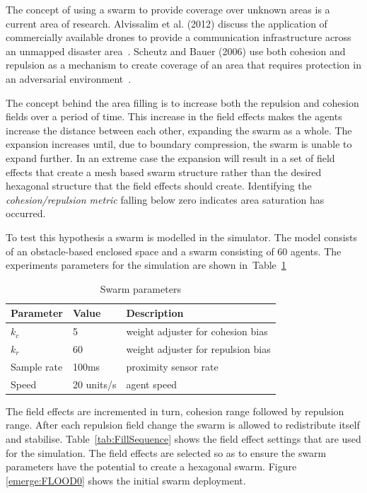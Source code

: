 \documentclass{ieeeaccess}
\begin{document}
The concept of using a swarm to provide coverage over unknown areas is a current area of research. Alvissalim et al. (2012) discuss the application of commercially available drones to provide a communication infrastructure across an unmapped disaster area~\cite{AZHMJJM:12}. Scheutz and Bauer (2006) use both cohesion and repulsion as a mechanism to create coverage of an area that requires protection in an adversarial environment~\cite{SB:06}.

The concept behind the area filling is to increase both the repulsion and cohesion fields over a period of time. This increase in the field effects makes the agents increase the distance between each other, expanding the swarm as a whole. The expansion increases until, due to boundary compression, the swarm is unable to expand further. In an extreme case the expansion will result in a set of field effects that create a mesh based swarm structure rather than the desired hexagonal structure that the field effects should create. Identifying the \textit{cohesion/repulsion metric} falling below zero indicates area saturation has occurred.

To test this hypothesis a swarm is modelled in the simulator. The model consists of an obstacle-based enclosed space and a swarm consisting of 60 agents. The experiments parameters for the simulation are shown in~Table~\ref{tab:FillParameters1}

\begin{table}[H]
\begin{center}
\begin{tabular}{| p{1.8cm} | p{1.5cm} | p{4.0cm} |}
\hline
\bf Parameter & \bf Value  & \bf Description \\ \hline
$k_c$         & 5          & weight adjuster for cohesion bias\\ \hline
$k_r$         & 60         & weight adjuster for repulsion bias\\ \hline
Sample rate   & 100ms      & proximity sensor rate\\ \hline
Speed         & 20 units/s & agent speed\\ \hline
\end{tabular}\caption{Swarm parameters} \label{tab:FillParameters1}
\end{center}
\end{table}

The field effects are incremented in turn, cohesion range followed by repulsion range. After each repulsion field change the swarm is allowed to redistribute itself and stabilise. Table~\ref{tab:FillSequence} shows the field effect settings that are used for the simulation. The field effects are selected so as to ensure the swarm parameters have the potential to create a hexagonal swarm. Figure \ref{emerge:FLOOD0} shows the initial swarm deployment.
\end{document}
